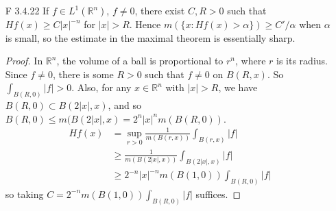 \documentclass[10pt]{article}
\newcommand{\R}{\mathbb{R}}
\newcommand{\Int}{{\displaystyle \int}}
\begin{document}
\begin{enumerate}
\begin{proof}
We may now simply take $\phi = \sum_1^N c_j \chi_{R_j}$ to be a simple function where each $R_j$ is a product of open intervals, such that $\Int |f - \phi| < \epsilon$.  Futher, we can assume the $R_j$ are disjoint, since otherwise we could take a disjoint refinement.  Each $R_j$ is of the form $R_j = I_1 \times \cdots \times I_n$ for some open intervals.  For $1 \leq i \leq n$, consider $I_i = (a_i,b_i)$.  We can define a continuous function $h_i$ by taking $h_i = a_j$ on $(a+\frac{\epsilon}{2}, b_i - \frac{\epsilon}{2})$, $0$ on $I_i^c$, and linear in between.  Then the product $g_j = h_1 \times \cdots \times h_n$ is a continuous function that agrees with $a_j\chi_{R_j}$ except on $S = R_j \setminus ((a_1 + \frac{\epsilon}{2}, b_1 - \frac{\epsilon}{2}) \times \cdots \times (a_n + \frac{\epsilon}{2}, b_n - \frac{\epsilon}{2}))$, where $|a_j \chi_{R_j} - h_j| \leq |a_j|$.  Thus,
\begin{align*}
\Int |a_j \chi_{R_j} - h_j| &= \Int_S |a_j \chi_{R_j} - h_j| \\
&\leq \Int_S |a_j| \\
&= m(S)|a_j| \\
&= \epsilon^n |a_j|
\end{align*}
can be made arbitrarily small.  Take $g = g_1 + \dots + g_n$.  Since the supports of the $g_i$ are disjoint, we see that
\begin{align*}
\Int |\phi - g| &\leq \sum_1^N \Int |a_j\chi_{R_j} - h_j| \leq N \epsilon
\end{align*}
can be made arbitrarily small.  Thus,
$$
\Int |f - g| \leq \Int |f - \phi| + \Int |\phi - g|
$$
can be made arbitrarily small.  $g$ is a sum of continuous functions, hence continuous, so the claim is proven.
\end{proof}

\item[F 3.4.22] If $f \in L^1(\R^n)$, $f \neq 0$, there exist $C,R > 0$ such that $Hf(x) \geq C|x|^{-n}$ for $|x|>R$.  Hence $m(\{x : Hf(x)>\alpha\}) \geq C'/\alpha$ when $\alpha$ is small, so the estimate in the maximal theorem is essentially sharp.

\begin{proof}
In $\R^n$, the volume of a ball is proportional to $r^n$, where $r$ is its radius.  Since $f \neq 0$, there is some $R > 0$ such that $f \neq 0$ on $B(R,x)$.  So $\Int_{B(R,0)} |f| > 0$.  Also, for any $x \in \R^n$ with $|x|>R$, we have $B(R,0) \subset B(2|x|,x)$, and so $B(R,0) \leq m(B(2|x|,x) = 2^n|x|^n m(B(R,0))$.
\begin{align*}
Hf(x) &= \sup_{r>0} \frac{1}{m(B(r,x))}\Int_{B(r,x)} |f| \\
&\geq \frac{1}{m(B(2|x|,x))}\Int_{B(2|x|,x)} |f| \\
&\geq 2^{-n}|x|^{-n}m(B(1,0))\Int_{B(R,0)} |f|
\end{align*}
so taking $C = 2^{-n}m(B(1,0))\Int_{B(R,0)} |f|$ suffices.


\end{proof}
\end{enumerate}
\end{document}

